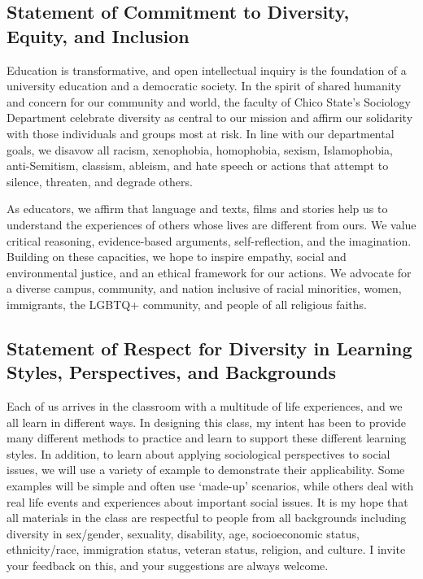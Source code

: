 \documentclass[11pt,]{article}
\begin{document}
\hypertarget{statement-of-commitment-to-diversity-equity-and-inclusion}{%
\subsection{Statement of Commitment to Diversity, Equity, and
Inclusion}\label{statement-of-commitment-to-diversity-equity-and-inclusion}}

Education is transformative, and open intellectual inquiry is the
foundation of a university education and a democratic society. In the
spirit of shared humanity and concern for our community and world, the
faculty of Chico State's Sociology Department celebrate diversity as
central to our mission and affirm our solidarity with those individuals
and groups most at risk. In line with our departmental goals, we disavow
all racism, xenophobia, homophobia, sexism, Islamophobia, anti-Semitism,
classism, ableism, and hate speech or actions that attempt to silence,
threaten, and degrade others.

As educators, we affirm that language and texts, films and stories help
us to understand the experiences of others whose lives are different
from ours. We value critical reasoning, evidence-based arguments,
self-reflection, and the imagination. Building on these capacities, we
hope to inspire empathy, social and environmental justice, and an
ethical framework for our actions. We advocate for a diverse campus,
community, and nation inclusive of racial minorities, women, immigrants,
the LGBTQ+ community, and people of all religious faiths.

\hypertarget{statement-of-respect-for-diversity-in-learning-styles-perspectives-and-backgrounds}{%
\subsection{Statement of Respect for Diversity in Learning Styles,
Perspectives, and
Backgrounds}\label{statement-of-respect-for-diversity-in-learning-styles-perspectives-and-backgrounds}}

Each of us arrives in the classroom with a multitude of life
experiences, and we all learn in different ways. In designing this
class, my intent has been to provide many different methods to practice
and learn to support these different learning styles. In addition, to
learn about applying sociological perspectives to social issues, we will
use a variety of example to demonstrate their applicability. Some
examples will be simple and often use `made-up' scenarios, while others
deal with real life events and experiences about important social
issues. It is my hope that all materials in the class are respectful to
people from all backgrounds including diversity in sex/gender,
sexuality, disability, age, socioeconomic status, ethnicity/race,
immigration status, veteran status, religion, and culture. I invite your
feedback on this, and your suggestions are always welcome.
\end{document}
